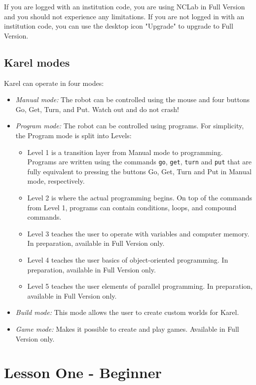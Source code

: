 \documentclass[article,A4,12pt]{llncs}
\begin{document}
If you are logged with an institution code, you are using NCLab in 
Full Version and you should not experience any limitations. If you are 
not logged in with an institution code, you can use the desktop icon "Upgrade" 
to upgrade to Full Version.

\subsection{Karel modes}

Karel can operate in four modes:
\begin{itemize}
\item {\em Manual mode:} The robot can be controlled using the mouse and four buttons Go, Get, Turn, and Put. Watch out and do not crash!
\item {\em Program mode:} The robot can be controlled using programs. For simplicity, the Program mode is split into Levels:
\begin{itemize}
\item Level 1 is a transition layer from Manual mode to programming. Programs are written using the commands {\tt go}, {\tt get}, {\tt turn} and {\tt put} that are fully equivalent to pressing the buttons Go, Get, Turn and Put in Manual mode, respectively.
\item Level 2 is where the actual programming begins. On top of the commands from Level 1, programs can contain conditions, loops, and compound commands.
\item Level 3 teaches the user to operate with variables and computer memory. In preparation, available in Full Version only.
\item Level 4 teaches the user basics of object-oriented programming. In preparation, available in Full Version only.
\item Level 5 teaches the user elements of parallel programming. In preparation, available in Full Version only.
\end{itemize}
\item {\em Build mode:} This mode allows the user to create custom worlds for Karel.
\item {\em Game mode:} Makes it possible to create and play games. Available in Full Version only.
\end{itemize}

\section{Lesson One - Beginner}
\end{document}
